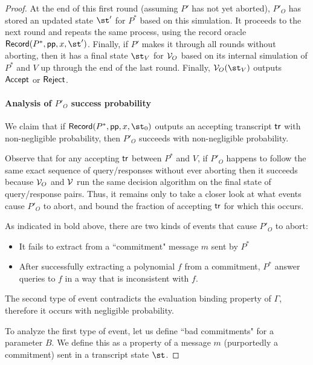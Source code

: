 \begin{proof}
At the end of this first round (assuming $P'$ has not yet aborted), $P'_O$ has stored an updated state $\st'$ for $P^*$ based on this simulation. It proceeds to the next round and repeats the same process, using the record oracle $\pro{Record}(P^*, \params, x, \st')$. Finally, if $P'$ makes it through all rounds without aborting, then it has a final state $\st_V$ for $\mathcal{V}_O$ based on its internal simulation of $P^*$ and $V$ up through the end of the last round. Finally, $\verifier_O(\st_V)$ outputs $\textsf{{Accept}}$ or $\textsf{{Reject}}$. %

\paragraph{Analysis of $P'_O$ success probability} 
We claim that if $\pro{Record}(P^*, \params, x, \st_0)$ outputs an accepting transcript $\textsf{{tr}}$ with non-negligible probability, then $P'_O$ succeeds with non-negligible probability. 

Observe that for any accepting $\textsf{{tr}}$ between $P^*$ and $V$, if $P'_O$ happens to follow the same exact sequence of query/responses without ever aborting then it succeeds because $\mathcal{V}_O$ and $\mathcal{V}$ run the same decision algorithm on the final state of query/response pairs. Thus, it remains only to take a closer look at what events cause $P'_O$ to abort, and bound the fraction of accepting $\textsf{{tr}}$ for which this occurs. 

As indicated in bold above, there are two kinds of events that cause $P'_O$ to abort: 
\begin{itemize}
\item It fails to extract from a ``commitment" message $m$ sent by $P^*$
\item After successfully extracting a polynomial $f$ from a commitment, $P^*$ answer queries to $f$ in a way that is inconsistent with $f$. 
\end{itemize}

The second type of event contradicts the evaluation binding property of $\Gamma$, therefore it occurs with negligible probability. 

To analyze the first type of event, let us define ``bad commitments" for a parameter $B$. We define this as a property of a message $m$ (purportedly a commitment) sent in a transcript state $\st$.


\end{proof}
